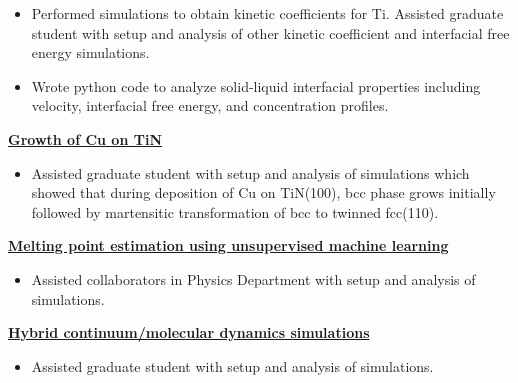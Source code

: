 \begin{cventries}
{\begin{cvitems}
                \vspace{2pt}
                \begin{itemize}
                \item {Performed simulations to obtain kinetic coefficients for Ti. Assisted graduate student with setup and analysis of other kinetic coefficient and interfacial free energy simulations.}
                \item {Wrote python code to analyze solid-liquid interfacial properties including velocity, interfacial free energy, and concentration profiles.}
                \end{itemize}
            \item {\textbf{\underline{Growth of Cu on TiN}}}
                \vspace{2pt}
                \begin{itemize}
                \item {Assisted graduate student with setup and analysis of simulations which showed that during deposition of Cu on TiN(100), bcc phase grows initially followed by martensitic transformation of bcc to twinned fcc(110).}
                \end{itemize}
            \item {\textbf{\underline{Melting point estimation using unsupervised machine learning}}}
                \vspace{2pt}
                \begin{itemize}
                \item {Assisted collaborators in Physics Department with setup and analysis of simulations.}
                \end{itemize}
            \item {\textbf{\underline{Hybrid continuum/molecular dynamics simulations}}}
                \vspace{2pt}
                \begin{itemize}
                \item {Assisted graduate student with setup and analysis of simulations.}
                \end{itemize}
        \end{cvitems}
    }


\end{cventries}
